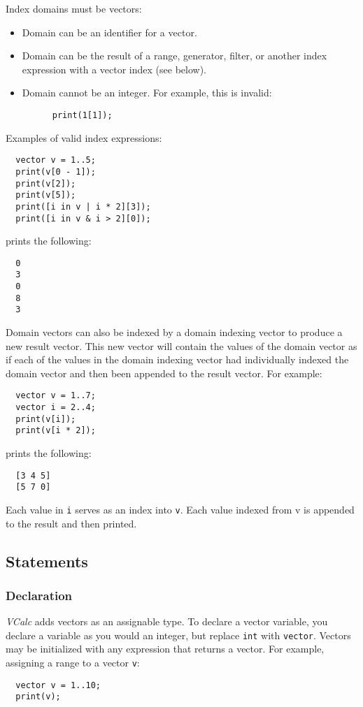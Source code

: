 \documentclass{article}
\newcommand{\code}[1]{\texttt{\textmd{#1}}}
\begin{document}
Index domains must be vectors:
\begin{itemize}
  \item
    Domain can be an identifier for a vector.
  \item
    Domain can be the result of a range, generator, filter, or another index expression with a
    vector index (see below).
  \item
    Domain cannot be an integer. For example, this is invalid:
    \begin{lstlisting}
      print(1[1]);
    \end{lstlisting}
\end{itemize}

Examples of valid index expressions:
\begin{lstlisting}
  vector v = 1..5;
  print(v[0 - 1]);
  print(v[2]);
  print(v[5]);
  print([i in v | i * 2][3]);
  print([i in v & i > 2][0]);
\end{lstlisting}

prints the following:
\begin{lstlisting}
  0
  3
  0
  8
  3
\end{lstlisting}

Domain vectors can also be indexed by a domain indexing vector to produce a new result vector. This
new vector will contain the values of the domain vector as if each of the values in the domain
indexing vector had individually indexed the domain vector and then been appended to the result
vector. For example:
\begin{lstlisting}
  vector v = 1..7;
  vector i = 2..4;
  print(v[i]);
  print(v[i * 2]);
\end{lstlisting}

prints the following:
\begin{lstlisting}
  [3 4 5]
  [5 7 0]
\end{lstlisting}

Each value in \code{i} serves as an index into \code{v}. Each value indexed from v is appended to
the result and then printed.

\subsection{Statements}
\subsubsection{Declaration}
\textit{VCalc} adds vectors as an assignable type. To declare a vector variable, you declare a
variable as you would an integer, but replace \code{int} with \code{vector}. Vectors may be
initialized with any expression that returns a vector. For example, assigning a range to a vector
\code{v}:
\begin{lstlisting}
  vector v = 1..10;
  print(v);
\end{lstlisting}
\end{document}
